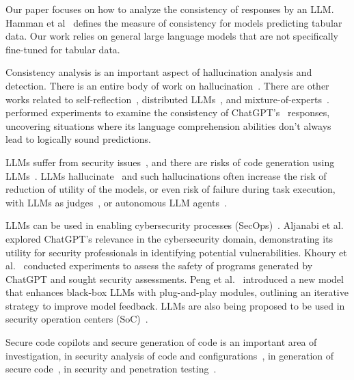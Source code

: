 Our paper focuses on how to analyze the consistency of responses by an LLM. Hamman et al~\cite{hamman2024quantifying} defines the measure of consistency for models predicting tabular data. Our work relies on general large language models that are not specifically fine-tuned for tabular data.  

Consistency analysis is an important aspect of hallucination analysis and detection. There is an entire body of work on hallucination~\cite{liu2024exploring}. There are other works related to self-reflection~\cite{ji-etal-2023-towards}, distributed LLMs~\cite{10476280}, and mixture-of-experts~\cite{du2024mixture}. \cite{jang2023consistency} performed experiments to examine the consistency of ChatGPT's~\cite{openai2023gpt35, openai2023gpt4} responses, uncovering situations where its language comprehension abilities don't always lead to logically sound predictions. 

 LLMs suffer from security issues~\cite{wu2024new,qachfar2024all}, and there are risks of code generation using LLMs~\cite{vaidya2023critical}. LLMs hallucinate~\cite{xu2024hallucination} and such hallucinations often increase the risk of reduction of utility of the models, or even risk of failure during task execution, with LLMs as judges~\cite{zheng2024judging}, or autonomous LLM agents~\cite{talebirad2023multi}. 
 

LLMs can be used in enabling cybersecurity processes (SecOps)~\cite{gennari2024considerations}. Aljanabi et al.~\cite{aljanabi2023chatgpt} explored ChatGPT's relevance in the cybersecurity domain, demonstrating its utility for security professionals in identifying potential vulnerabilities. Khoury et al.~\cite{khoury2023secure} conducted experiments to assess the safety of programs generated by ChatGPT and sought security assessments. Peng et al.~\cite{peng2023check} introduced a new model that enhances black-box LLMs with plug-and-play modules, outlining an iterative strategy to improve model feedback. LLMs are also being proposed to be used in security operation centers (SoC)~\cite{saha2024llm}. \par

Secure code copilots and secure generation of code is an important area of investigation, in security analysis of code and configurations~\cite{toth2024llms, minna2024analyzing}, in generation of secure code~\cite{vaidya2023critical,saha2024empowering}, in security and penetration testing~\cite{song2024poster}. 

